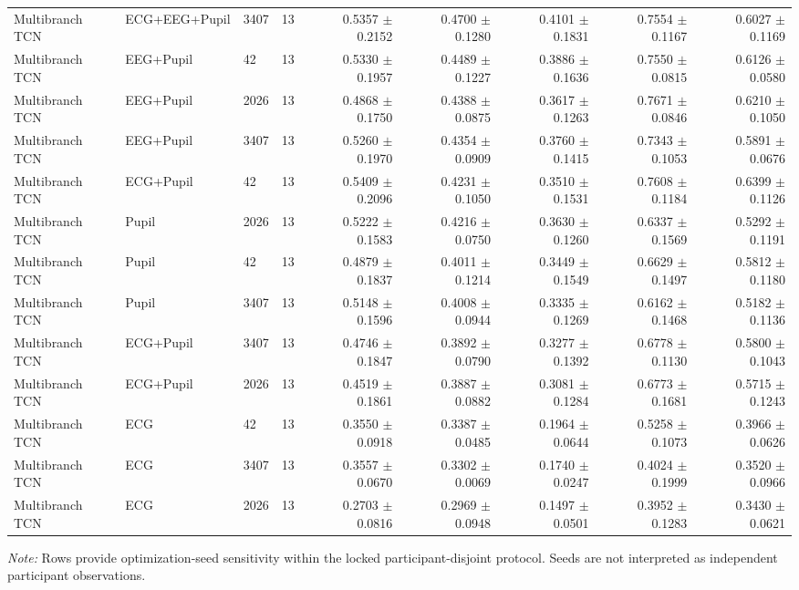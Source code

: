 \begin{table}[htbp]
{\begin{tabular}{lllrrrrrr}
Multibranch TCN & ECG+EEG+Pupil & 3407 & 13 & 0.5357 $\pm$ 0.2152 & 0.4700 $\pm$ 0.1280 & 0.4101 $\pm$ 0.1831 & 0.7554 $\pm$ 0.1167 & 0.6027 $\pm$ 0.1169 \\
Multibranch TCN & EEG+Pupil & 42 & 13 & 0.5330 $\pm$ 0.1957 & 0.4489 $\pm$ 0.1227 & 0.3886 $\pm$ 0.1636 & 0.7550 $\pm$ 0.0815 & 0.6126 $\pm$ 0.0580 \\
Multibranch TCN & EEG+Pupil & 2026 & 13 & 0.4868 $\pm$ 0.1750 & 0.4388 $\pm$ 0.0875 & 0.3617 $\pm$ 0.1263 & 0.7671 $\pm$ 0.0846 & 0.6210 $\pm$ 0.1050 \\
Multibranch TCN & EEG+Pupil & 3407 & 13 & 0.5260 $\pm$ 0.1970 & 0.4354 $\pm$ 0.0909 & 0.3760 $\pm$ 0.1415 & 0.7343 $\pm$ 0.1053 & 0.5891 $\pm$ 0.0676 \\
Multibranch TCN & ECG+Pupil & 42 & 13 & 0.5409 $\pm$ 0.2096 & 0.4231 $\pm$ 0.1050 & 0.3510 $\pm$ 0.1531 & 0.7608 $\pm$ 0.1184 & 0.6399 $\pm$ 0.1126 \\
Multibranch TCN & Pupil & 2026 & 13 & 0.5222 $\pm$ 0.1583 & 0.4216 $\pm$ 0.0750 & 0.3630 $\pm$ 0.1260 & 0.6337 $\pm$ 0.1569 & 0.5292 $\pm$ 0.1191 \\
Multibranch TCN & Pupil & 42 & 13 & 0.4879 $\pm$ 0.1837 & 0.4011 $\pm$ 0.1214 & 0.3449 $\pm$ 0.1549 & 0.6629 $\pm$ 0.1497 & 0.5812 $\pm$ 0.1180 \\
Multibranch TCN & Pupil & 3407 & 13 & 0.5148 $\pm$ 0.1596 & 0.4008 $\pm$ 0.0944 & 0.3335 $\pm$ 0.1269 & 0.6162 $\pm$ 0.1468 & 0.5182 $\pm$ 0.1136 \\
Multibranch TCN & ECG+Pupil & 3407 & 13 & 0.4746 $\pm$ 0.1847 & 0.3892 $\pm$ 0.0790 & 0.3277 $\pm$ 0.1392 & 0.6778 $\pm$ 0.1130 & 0.5800 $\pm$ 0.1043 \\
Multibranch TCN & ECG+Pupil & 2026 & 13 & 0.4519 $\pm$ 0.1861 & 0.3887 $\pm$ 0.0882 & 0.3081 $\pm$ 0.1284 & 0.6773 $\pm$ 0.1681 & 0.5715 $\pm$ 0.1243 \\
Multibranch TCN & ECG & 42 & 13 & 0.3550 $\pm$ 0.0918 & 0.3387 $\pm$ 0.0485 & 0.1964 $\pm$ 0.0644 & 0.5258 $\pm$ 0.1073 & 0.3966 $\pm$ 0.0626 \\
Multibranch TCN & ECG & 3407 & 13 & 0.3557 $\pm$ 0.0670 & 0.3302 $\pm$ 0.0069 & 0.1740 $\pm$ 0.0247 & 0.4024 $\pm$ 0.1999 & 0.3520 $\pm$ 0.0966 \\
Multibranch TCN & ECG & 2026 & 13 & 0.2703 $\pm$ 0.0816 & 0.2969 $\pm$ 0.0948 & 0.1497 $\pm$ 0.0501 & 0.3952 $\pm$ 0.1283 & 0.3430 $\pm$ 0.0621 \\
\bottomrule
\end{tabular}%
}
\par\medskip\footnotesize\textit{Note:} Rows provide optimization-seed sensitivity within the locked participant-disjoint protocol. Seeds are not interpreted as independent participant observations.
\end{table}
